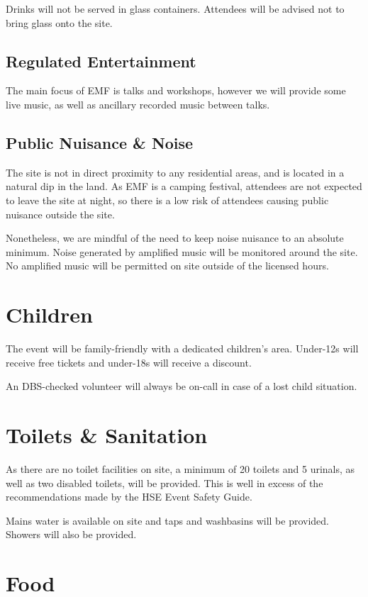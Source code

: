 Drinks will not be served in glass containers. Attendees will be advised not to bring
glass onto the site.

\subsection{Regulated Entertainment}

The main focus of EMF is talks and workshops, however we will provide some live music,
as well as ancillary recorded music between talks.

\subsection{Public Nuisance \& Noise}

The site is not in direct proximity to any residential areas, and is located in a
natural dip in the land. As EMF is a camping festival, attendees are not expected to leave the site
at night, so there is a low risk of attendees causing public nuisance outside the site.

Nonetheless, we are mindful of the need to keep noise nuisance
to an absolute minimum. Noise generated by amplified music will be monitored around the site.
No amplified music will be permitted on site outside of the licensed hours.

\section{Children}

The event will be family-friendly with a dedicated children's area. Under-12s will receive free tickets
and under-18s will receive a discount.

An DBS-checked volunteer will always be on-call in case of a lost child situation.

\section{Toilets \& Sanitation}

As there are no toilet facilities on site, a minimum of 20 toilets and 5 urinals, as well as two disabled toilets,
will be provided. This is well in excess of the recommendations made by the HSE Event Safety Guide.

Mains water is available on site and taps and washbasins will be provided. Showers will also be provided.

\section{Food}

